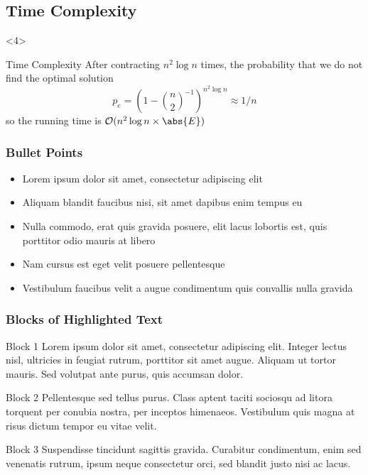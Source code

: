 \documentclass{beamer}
\begin{document}
\begin{frame}
\begin{overlayarea}{\linewidth}{\textheight}
\subsection{Time Complexity}	
	\begin{onlyenv}
		\begin{block}{Time Complexity}
		After contracting $n^2\log{}n$ times, the probability that we do not find the optimal solution
		\begin{equation*}
			p_e = (1-{\binom n2}^{-1})^{n^2\log{}n} \approx 1/n
		\end{equation*}
		so the running time is $\mathcal{O}(n^2\log{}n\times \abs{E})$
		\end{block}

	\end{onlyenv}

\end{overlayarea}
	
\end{frame}


\begin{frame}
\frametitle{Bullet Points}
\begin{itemize}
\item Lorem ipsum dolor sit amet, consectetur adipiscing elit
\item Aliquam blandit faucibus nisi, sit amet dapibus enim tempus eu
\item Nulla commodo, erat quis gravida posuere, elit lacus lobortis est, quis porttitor odio mauris at libero
\item Nam cursus est eget velit posuere pellentesque
\item Vestibulum faucibus velit a augue condimentum quis convallis nulla gravida
\end{itemize}
\end{frame}


\begin{frame}
\frametitle{Blocks of Highlighted Text}
\begin{block}{Block 1}
Lorem ipsum dolor sit amet, consectetur adipiscing elit. Integer lectus nisl, ultricies in feugiat rutrum, porttitor sit amet augue. Aliquam ut tortor mauris. Sed volutpat ante purus, quis accumsan dolor.
\end{block}

\begin{block}{Block 2}
Pellentesque sed tellus purus. Class aptent taciti sociosqu ad litora torquent per conubia nostra, per inceptos himenaeos. Vestibulum quis magna at risus dictum tempor eu vitae velit.
\end{block}

\begin{block}{Block 3}
Suspendisse tincidunt sagittis gravida. Curabitur condimentum, enim sed venenatis rutrum, ipsum neque consectetur orci, sed blandit justo nisi ac lacus.
\end{block}
\end{frame}
\end{document}
